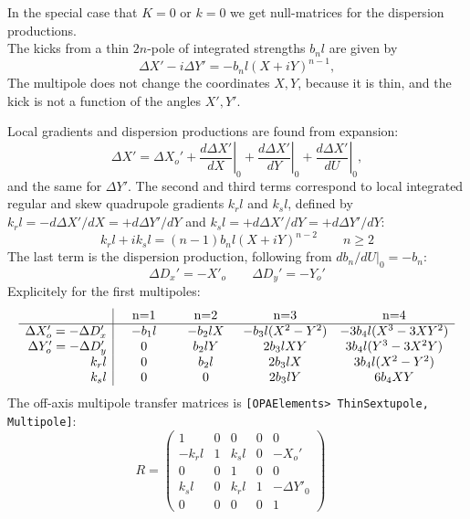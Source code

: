 \documentclass[12pt]{article}
\newcommand\beq{\begin{equation}}
\newcommand\eeq{\end{equation}}
\newcommand\code[1]{{\tt [#1]}}
\begin{document}
In the special case that $K=0$ or $k=0$ we get null-matrices for the dispersion productions.\\


The kicks from a thin $2n$-pole of integrated strengths $b_nl$ are given by
\beq
\Delta X' - i \Delta Y ' = - b_nl (X+iY)^{n-1},
\eeq
The multipole does not change the coordinates $X,Y$, because it is thin, and the kick is not a function of the angles $X',Y'$.

Local gradients and dispersion productions are found from expansion:
\[
\Delta X' = \Delta X_o' + \left. \frac{d\Delta X'}{dX}\right|_{0} + \left. \frac{d\Delta X'}{dY}\right|_{0}
+ \left. \frac{d\Delta X'}{dU}\right|_{0},
\]
and the same for $\Delta Y'$. The second and third terms correspond to local integrated regular and skew quadrupole gradients $k_rl$ and $k_sl$, defined by $k_rl=-d\Delta X'/dX=+d\Delta Y'/dY$ and $k_sl=+d\Delta X'/dY=+d\Delta Y'/dY$:
\beq
k_rl + i k_sl = (n-1) b_nl  (X+iY)^{n-2}\qquad n\geq 2
\eeq
The last term is the dispersion production, following from $db_n/dU|_0=-b_n$:
\beq
\Delta D_x'= - X'_o\qquad \Delta D_y'=-Y_o'
\eeq
Explicitely for the first multipoles:
\beq\label{eq:mpole}
\begin{array}{r|cccc}
& \quad $n=1$ \quad & \quad $n=2$ \quad & \quad $n=3$ \quad & \quad $n=4$ \quad  \\
\hline
\Delta X'_o = -\Delta D_x' & -b_1l &  - b_2l X & -b_3l (X^2-Y^2) & -3b_4l (X^3-3XY^2) \\
\Delta Y'_o= -\Delta D_y'  &     0 &    b_2l Y &  2 b_3l X Y  &  3 b_4l (Y^3-3X^2Y) \\
k_rl  & 0 & b_2l &  2 b_3l X & 3 b_4l (X^2-Y^2) \\
k_sl  & 0 & 0    &  2 b_3l Y & 6 b_4 XY \\
\end{array}
\eeq
The off-axis multipole transfer matrices is \code{OPAElements> ThinSextupole, Multipole}:
\beq
R = \left(\begin{array}{ccccc} 1 & 0 & 0 & 0 & 0 \\
                             - k_rl & 1 & k_sl & 0 & -X_o' \\
                               0 & 0 & 1 & 0 & 0 \\
                               k_sl & 0 & k_rl & 1 & -\Delta Y'_0 \\
                               0 & 0 & 0 & 0 & 1
\end{array}\right) \quad
\eeq
\end{document}

